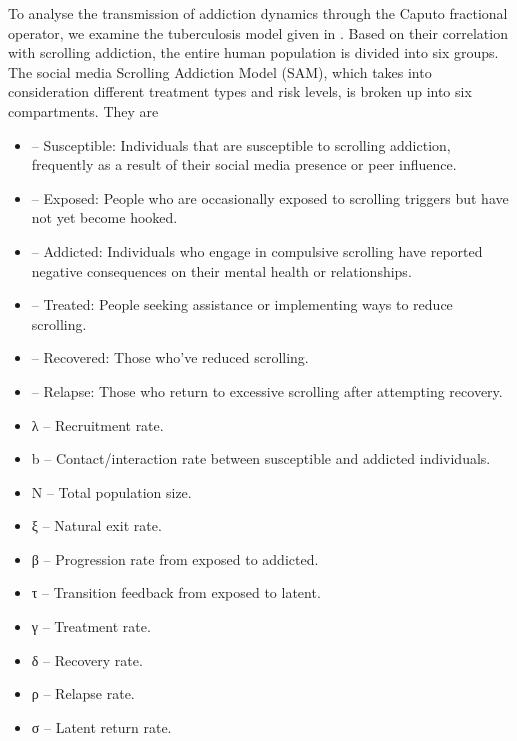 \documentclass[10pt]{NSP1}
\begin{document}
\par\medskip{}\smallskip

To analyse the transmission of addiction dynamics through the Caputo fractional operator, we examine the tuberculosis model given in . Based on their correlation with scrolling addiction, the entire human population is divided into six groups. The social media Scrolling Addiction Model (SAM), which takes into consideration different treatment types and risk levels, is broken up into six compartments. They are

\begin{itemize}
  \item – Susceptible: Individuals that are susceptible to scrolling addiction, frequently as a result of their social media presence or peer influence.
  \item – Exposed: People who are occasionally exposed to scrolling triggers but have not yet become hooked.
  \item – Addicted: Individuals who engage in compulsive scrolling have reported negative consequences on their mental health or relationships.
  \item – Treated: People seeking assistance or implementing ways to reduce scrolling.
  \item – Recovered: Those who’ve reduced scrolling.
  \item – Relapse: Those who return to excessive scrolling after attempting recovery.
\end{itemize}

\par\medskip{}\smallskip

\par\medskip{}\smallskip

\begin{itemize}
  \item λ – Recruitment rate.
  \item b – Contact/interaction rate between susceptible and addicted individuals.
  \item N – Total population size.
  \item ξ – Natural exit rate.
  \item β – Progression rate from exposed to addicted.
  \item τ – Transition feedback from exposed to latent.
  \item γ – Treatment rate.
  \item δ – Recovery rate.
  \item ρ – Relapse rate.
  \item σ – Latent return rate.
\end{itemize}
\end{document}
